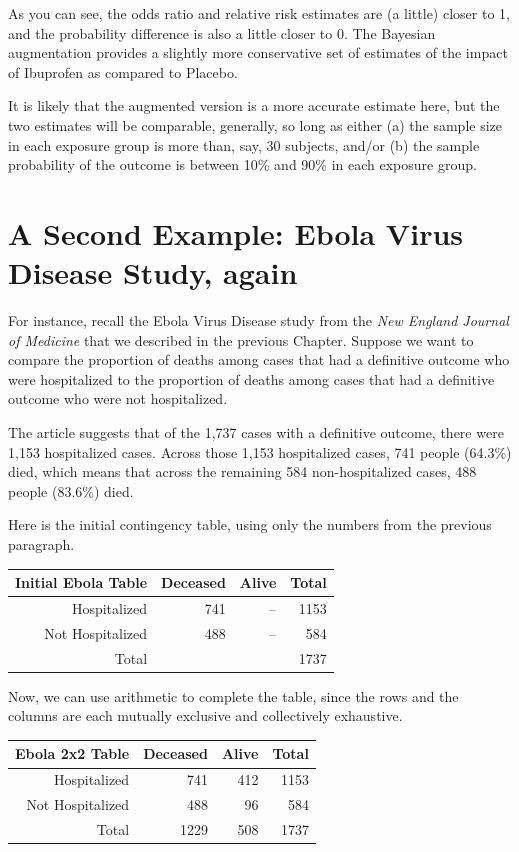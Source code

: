 \documentclass[
]{book}
\begin{document}
As you can see, the odds ratio and relative risk estimates are (a little) closer to 1, and the probability difference is also a little closer to 0. The Bayesian augmentation provides a slightly more conservative set of estimates of the impact of Ibuprofen as compared to Placebo.

It is likely that the augmented version is a more accurate estimate here, but the two estimates will be comparable, generally, so long as either (a) the sample size in each exposure group is more than, say, 30 subjects, and/or (b) the sample probability of the outcome is between 10\% and 90\% in each exposure group.

\hypertarget{a-second-example-ebola-virus-disease-study-again}{%
\section{A Second Example: Ebola Virus Disease Study, again}\label{a-second-example-ebola-virus-disease-study-again}}

For instance, recall the Ebola Virus Disease study from the \emph{New England Journal of Medicine} that we described in the previous Chapter. Suppose we want to compare the proportion of deaths among cases that had a definitive outcome who were hospitalized to the proportion of deaths among cases that had a definitive outcome who were not hospitalized.

The article suggests that of the 1,737 cases with a definitive outcome, there were 1,153 hospitalized cases. Across those 1,153 hospitalized cases, 741 people (64.3\%) died, which means that across the remaining 584 non-hospitalized cases, 488 people (83.6\%) died.

Here is the initial contingency table, using only the numbers from the previous paragraph.

\begin{longtable}[]{@{}rrrr@{}}
\toprule
Initial Ebola Table & Deceased & Alive & Total\tabularnewline
\midrule
\endhead
Hospitalized & 741 & -- & 1153\tabularnewline
Not Hospitalized & 488 & -- & 584\tabularnewline
Total & & & 1737\tabularnewline
\bottomrule
\end{longtable}

Now, we can use arithmetic to complete the table, since the rows and the columns are each mutually exclusive and collectively exhaustive.

\begin{longtable}[]{@{}rrrr@{}}
\toprule
Ebola 2x2 Table & Deceased & Alive & Total\tabularnewline
\midrule
\endhead
Hospitalized & 741 & 412 & 1153\tabularnewline
Not Hospitalized & 488 & 96 & 584\tabularnewline
Total & 1229 & 508 & 1737\tabularnewline
\bottomrule
\end{longtable}
\end{document}
